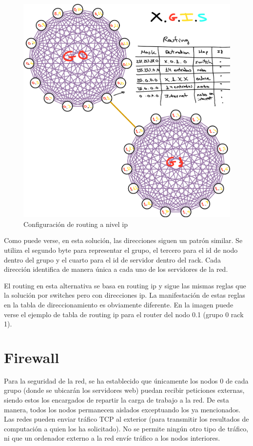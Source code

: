 \documentclass[%
    school=etsisi,%
    degree=61TI,%
]{upm-report}
\begin{document}
\begin{figure}
    \centering
    \includegraphics[width=1.0\textwidth]{figures/routing-ip.png}
    \caption{\label{fig:ip-routing} Configuración de routing a nivel ip}
\end{figure}

Como puede verse, en esta solución, las direcciones siguen un patrón similar. Se utiliza el segundo byte para representar el grupo, el tercero para el id de nodo dentro del grupo y el cuarto para el id de servidor dentro del rack. Cada dirección identifica de manera única a cada uno de los servidores de la red.

El routing en esta alternativa se basa en routing ip y sigue las mismas reglas que la solución por switches pero con direcciones ip. La manifestación de estas reglas en la tabla de direccionamiento es obviamente diferente. En la imagen puede verse el ejemplo de tabla de routing ip para el router del nodo 0.1 (grupo 0 rack 1).

\section{Firewall}

Para la seguridad de la red, se ha establecido que únicamente los nodos 0 de cada grupo (donde se ubicarán los servidores web) puedan recibir peticiones externas, siendo estos los encargados de repartir la carga de trabajo a la red. De esta manera, todos los nodos permanecen aislados exceptuando los ya mencionados. Las redes pueden enviar tráfico TCP al exterior (para transmitir los resultados de computación a quien los ha solicitado). No se permite ningún otro tipo de tráfico, ni que un ordenador externo a la red envíe tráfico a los nodos interiores.
\end{document}
